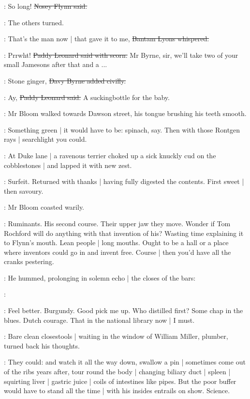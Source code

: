 \nosey:
So long!
\sout{Nosey Flynn said.}

:
The others turned.

\bantam:
That's the man now |
that gave it to me,
\sout{Bantam Lyons whispered.}

\leonard:
Prrwht!
\sout{Paddy Leonard said with scorn.}
Mr Byrne, sir,
we'll take two of your small Jamesons after that and a ...

\davybyrne:
Stone ginger,
\sout{Davy Byrne added civilly.}

\leonard:
Ay,
\sout{Paddy Leonard said.}
A suckingbottle for the baby.

:
Mr Bloom walked towards Dawson street,
his tongue brushing his teeth smooth.

\BloomInt:
Something green |
it would have to be:
spinach, say.
Then with those Rontgen rays |
searchlight you could.

:
At Duke lane |
a ravenous terrier choked up a sick knuckly cud on the cobblestones |
and lapped it with new zest.

\BloomInt:
Surfeit.
Returned with thanks |
having fully digested the contents.
First sweet |
then savoury.

:
Mr Bloom coasted warily.

\BloomInt:
Ruminants.
His second course.
Their upper jaw they move.
Wonder if Tom Rochford will do anything with that invention of his?
Wasting time explaining it to Flynn's mouth.
Lean people |
long mouths.
Ought to be a hall or a place where inventors could go in and invent free.
Course |
then you'd have all the cranks pestering.

:
He hummed,
prolonging in solemn echo |
the closes of the bars:

\Bloom:


\BloomInt:
Feel better.
Burgundy.
Good pick me up.
Who distilled first?
Some chap in the blues.
Dutch courage.
That  in the national library now |
I must.

:
Bare clean closestools |
waiting in the window of William Miller, plumber,
turned back his thoughts.

\BloomInt:
They could:
and watch it all the way down,
swallow a pin |
sometimes come out of the ribs years after,
tour round the body |
changing biliary duct |
spleen |
squirting liver |
gastric juice |
coils of intestines like pipes.
But the poor buffer
would have to stand all the time |
with his insides entrails on show.
Science.

